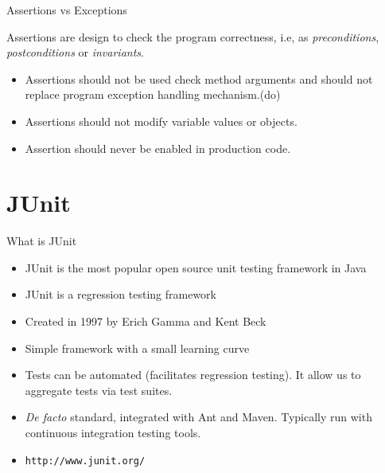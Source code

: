 \documentclass[11pt, xcolor=svgnames]{beamer}
\begin{document}

\begin{frame}[fragile]{Assertions vs Exceptions}

Assertions are design to check the program correctness, i.e, as \emph{preconditions}, \emph{postconditions} or \emph{invariants}.

\begin{itemize}
 \item Assertions should not be used check method arguments and should not replace program exception handling mechanism.\newline (do)
 \item Assertions should not modify variable values or objects.
 \item Assertion should never be enabled in production code.
\end{itemize}


\end{frame}



\section{JUnit}


\begin{frame}{What is JUnit}

  \begin{itemize}
     \item JUnit is the most popular open source unit testing framework in Java
     \item JUnit is a regression testing framework
     \item Created in 1997 by Erich Gamma and Kent Beck
     \item Simple framework with a small learning curve
     \item Tests can be automated (facilitates regression testing). It allow us to aggregate tests via test suites.
     \item \textit{De facto} standard, integrated with Ant and Maven. Typically run with continuous integration testing tools. 
     \item \texttt{http://www.junit.org/}
  \end{itemize}
\end{frame}
\end{document}
